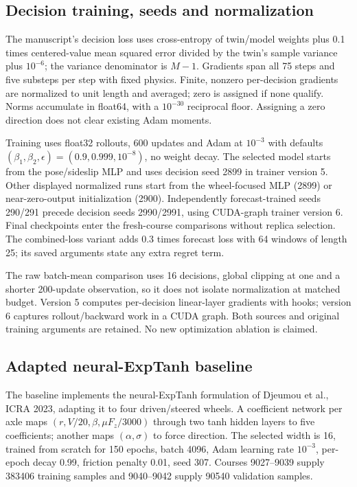\documentclass[11pt]{article}
\begin{document}
\subsection{Decision training, seeds and normalization}
The manuscript's decision loss uses cross-entropy of twin/model weights plus 0.1 times centered-value mean squared error divided by the twin's sample variance plus $10^{-6}$; the variance denominator is $M-1$. Gradients span all 75 steps and five substeps per step with fixed physics. Finite, nonzero per-decision gradients are normalized to unit length and averaged; zero is assigned if none qualify. Norms accumulate in float64, with a $10^{-30}$ reciprocal floor. Assigning a zero direction does not clear existing Adam moments.

Training uses float32 rollouts, 600 updates and Adam at $10^{-3}$ with defaults $(\beta_1,\beta_2,\epsilon)=(0.9,0.999,10^{-8})$, no weight decay. The selected model starts from the pose/sideslip MLP and uses decision seed 2899 in trainer version 5. Other displayed normalized runs start from the wheel-focused MLP (2899) or near-zero-output initialization (2900). Independently forecast-trained seeds 290/291 precede decision seeds 2990/2991, using CUDA-graph trainer version 6. Final checkpoints enter the fresh-course comparisons without replica selection. The combined-loss variant adds 0.3 times forecast loss with 64 windows of length 25; its saved arguments state any extra regret term.

The raw batch-mean comparison uses 16 decisions, global clipping at one and a shorter 200-update observation, so it does not isolate normalization at matched budget. Version 5 computes per-decision linear-layer gradients with hooks; version 6 captures rollout/backward work in a CUDA graph. Both sources and original training arguments are retained. No new optimization ablation is claimed.

\subsection{Adapted neural-ExpTanh baseline}
The baseline implements the neural-ExpTanh formulation of Djeumou et al., ICRA 2023, adapting it to four driven/steered wheels. A coefficient network per axle maps $(r,V/20,\beta,\mu F_z/3000)$ through two tanh hidden layers to five coefficients; another maps $(\alpha,\sigma)$ to force direction. The selected width is 16, trained from scratch for 150 epochs, batch 4096, Adam learning rate $10^{-3}$, per-epoch decay 0.99, friction penalty 0.01, seed 307. Courses 9027--9039 supply 383406 training samples and 9040--9042 supply 90540 validation samples.
\end{document}
